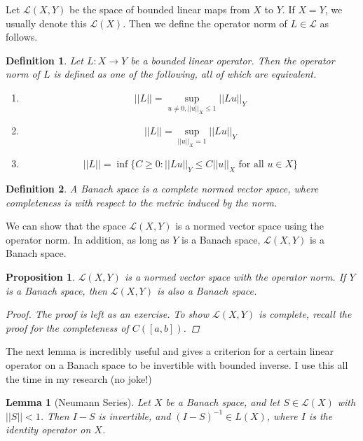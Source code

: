 \documentclass[10pt]{article}         %
\newtheorem{definition}{Definition}[section]
\newtheorem{proposition}{Proposition}[section]
\newtheorem{lemma}{Lemma}[section]
\theoremstyle{remark}
\begin{document}
Let $\mathcal{L}(X, Y)$ be the space of bounded linear maps from $X$ to $Y$. If $X = Y$, we usually denote this $\mathcal{L}(X)$. Then we define the operator norm of $L \in \mathcal{L}$ as follows.

\begin{definition}
Let $L: X \rightarrow Y$ be a bounded linear operator. Then the \emph{operator norm} of $L$ is defined as one of the following, all of which are equivalent.
\begin{enumerate}
\item 
\[
||L|| = \sup_{u \neq 0, ||u||_X \leq 1} ||Lu||_Y 
\]
\item 
\[
||L|| = \sup_{||u||_X = 1} ||Lu||_Y 
\]
\item
\[
||L|| = \inf\{ C \geq 0: ||Lu||_Y \leq C ||u||_X \text{ for all } u \in X \}
\]
\end{enumerate}
\end{definition}

\begin{definition}
A \emph{Banach space} is a complete normed vector space, where completeness is with respect to the metric induced by the norm.
\end{definition}

We can show that the space $\mathcal{L}(X, Y)$ is a normed vector space using the operator norm. In addition, as long as $Y$ is a Banach space, $\mathcal{L}(X, Y)$ is a Banach space.

\begin{proposition}
$\mathcal{L}(X, Y)$ is a normed vector space with the operator norm. If $Y$ is a Banach space, then $\mathcal{L}(X, Y)$ is also a Banach space.
\begin{proof}
The proof is left as an exercise. To show $\mathcal{L}(X, Y)$ is complete, recall the proof for the completeness of $C([a,b])$.
\end{proof}
\end{proposition}

The next lemma is incredibly useful and gives a criterion for a certain linear operator on a Banach space to be invertible with bounded inverse. I use this all the time in my research (no joke!)

\begin{lemma}[Neumann Series]
Let $X$ be a Banach space, and let $S \in \mathcal{L}(X)$ with $||S|| < 1$. Then $I - S$ is invertible, and $(I - S)^{-1} \in L(X)$, where $I$ is the identity operator on $X$.
\end{lemma}
\end{document}
